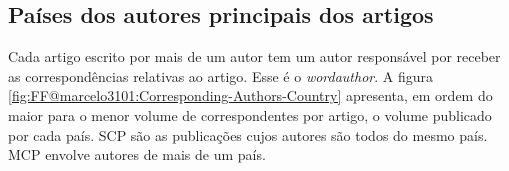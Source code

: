 \begin{table}[htp]
\centering
{}
\caption{10 países com maior impacto de citações no tema do \dataset\ FF@marcelo3101}
\label{tab:FF@marcelo3101:Most-Cited-Countries}
\end{table}

\subsection{Países dos autores principais dos artigos}

Cada artigo escrito por mais de um autor tem um autor responsável por receber as correspondências relativas ao artigo. Esse é o  \textit{wordauthor}. A figura \ref{fig:FF@marcelo3101:Corresponding-Authors-Country} apresenta, em ordem do maior para o menor volume de correspondentes por artigo, o volume publicado por cada país. SCP são as publicações cujos autores são todos do mesmo país. MCP envolve autores de mais de um país.

